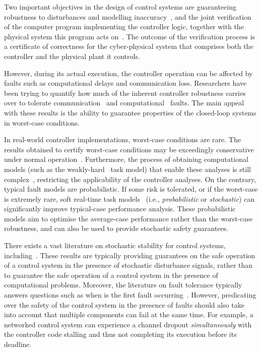 Two important objectives in the design of control systems are guaranteeing robustness to disturbances and modelling inaccuracy~\cite{Astrom:1997}, and the joint verification of the computer program implementing the controller logic, together with the physical system this program acts on~\cite{Bohrer:2018}.
The outcome of the verification process is a certificate of correctness for the cyber-physical system that comprises both the controller and the physical plant it controls.

However, during its actual execution, the controller operation can be affected by faults such as computational delays and communication loss.
Researchers have been trying to quantify how much of the inherent controller robustness carries over to tolerate communication~\cite{Ahrendts:2018, Linsenmayer:2017, Yang:2021} and computational~\cite{Pazzaglia:2018, Maggio:2020, Hobbs:2022} faults.
The main appeal with these results is the ability to guarantee properties of the closed-loop systems in worst-case conditions.

In real-world controller implementations, worst-case conditions are rare.
The results obtained to certify worst-case conditions may be exceedingly conservative under normal operation~\cite{Vreman:2021}.
Furthermore, the process of obtaining computational models (such as the weakly-hard~\cite{Bernat:2001} task model) that enable these analyses is still complex~\cite{Sun:2017}, restricting the applicability of the controller analyses.
On the contrary, typical fault models are probabilistic.
If some risk is tolerated, or if the worst-case is extremely rare, soft real-time task models~\cite{Buttazzo:2005} (i.e., \emph{probabilistic} or \emph{stochastic}) can significantly improve typical-case performance analysis.
These probabilistic models aim to optimise the average-case performance rather than the worst-case robustness, and can also be used to provide stochastic safety guarantees.

There exists a vast literature on stochastic stability for control systems, including~\cite{Fang:2002, Liberzon:2014, Blair:1975, Lincoln:2002, Bolzern:2010, Astrom:1970}.
These results are typically providing guarantees on the safe operation of a control system in the presence of stochastic disturbance signals, rather than to guarantee the safe operation of a control system in the presence of computational problems.
Moreover, the literature on fault tolerance typically answers questions such as when is the first fault occurring~\cite{Safari:2022}.
However, predicating over the safety of the control system in the presence of faults should also take into account that multiple components can fail at the same time.
For example, a networked control system can experience a channel dropout \emph{simultaneously} with the controller code stalling and thus not completing its execution before its deadline.

